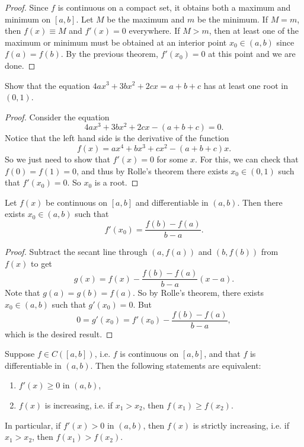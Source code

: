 \begin{proof}
  Since $f$ is continuous on a compact set, it obtains
  both a maximum and minimum on $[a, b]$. Let
  $M$ be the maximum and $m$ be the minimum. If
  $M = m$, then $f(x) \equiv M$ and $f'(x) = 0$
  everywhere. If $M > m$, then at least one of the maximum
  or minimum must be obtained at an interior point
  $x_0 \in (a, b)$ since $f(a) = f(b)$. By the previous
  theorem, $f'(x_0) = 0$ at this point and we are done.
\end{proof}

\begin{example}
  Show that the equation
  $4ax^3 + 3bx^2 + 2cx = a + b + c$ has at least one
  root in $(0, 1)$.
\end{example}

\begin{proof}
  Consider the equation
  \[
    4ax^3 + 3bx^2 + 2cx - (a + b + c) = 0.
  \]
  Notice that the left hand side is the derivative
  of the function
  \[f(x) = ax^4 + bx^3 + cx^2 - (a + b + c)x.\]
  So we just need to show that $f'(x) = 0$ for some
  $x$. For this, we can check that $f(0) = f(1) = 0$,
  and thus by Rolle's theorem there exists
  $x_0 \in (0, 1)$ such that $f'(x_0) = 0$. So
  $x_0$ is a root.
\end{proof}

\begin{theorem}
  Let $f(x)$ be continuous on $[a, b]$ and differentiable
  in $(a, b)$. Then there exists $x_0 \in (a, b)$
  such that
  \[f'(x_0) = \frac{f(b) - f(a)}{b - a}.\]
\end{theorem}

\begin{proof}
  Subtract the secant line through $(a, f(a))$ and
  $(b, f(b))$ from $f(x)$ to get
  \[g(x) = f(x) - \frac{f(b) - f(a)}{b - a} (x - a).\]
  Note that $g(a) = g(b) = f(a)$. So by Rolle's theorem,
  there exists $x_0 \in (a, b)$ such that $g'(x_0) = 0$.
  But
  \[
    0 = g'(x_0) = f'(x_0) - \frac{f(b) - f(a)}{b - a},
  \]
  which is the desired result.
\end{proof}

\begin{corollary}
  Suppose $f \in C([a, b])$, i.e. $f$ is continuous
  on $[a, b]$, and that $f$ is differentiable in
  $(a, b)$. Then the following statements are equivalent:
  \begin{enumerate}
    \item $f'(x) \ge 0$ in $(a, b)$,
    \item $f(x)$ is increasing, i.e. if $x_1 > x_2$,
      then $f(x_1) \ge f(x_2)$.
  \end{enumerate}
  In particular, if $f'(x) > 0$ in $(a, b)$, then
  $f(x)$ is strictly increasing, i.e. if $x_1 > x_2$,
  then $f(x_1) > f(x_2)$.
\end{corollary}

